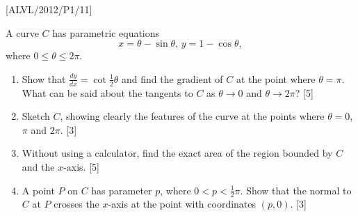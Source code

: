 \item {[}ALVL/2012/P1/11{]}

A curve $C$ has parametric equations 
\[
x=\theta-\sin\theta,\,y=1-\cos\theta,
\]
where $0\le\theta\le2\pi$.
\begin{enumerate}
\item Show that $\frac{dy}{dx}=\cot\frac{1}{2}\theta$ and find the gradient
of $C$ at the point where $\theta=\pi$. What can be said about the
tangents to $C$ as $\theta\rightarrow0$ and $\theta\rightarrow2\pi$?
\hfill{}{[}5{]}
\item Sketch $C$, showing clearly the features of the curve at the points
where $\theta=0$, $\pi$ and $2\pi$. \hfill{}{[}3{]}
\item Without using a calculator, find the exact area of the region bounded
by $C$ and the $x$-axis. \hfill{}{[}5{]}
\item A point $P$ on $C$ has parameter $p$, where $0<p<\frac{1}{2}\pi$.
Show that the normal to $C$ at $P$ crosses the $x$-axis at the
point with coordinates $\left(p,0\right)$. \hfill{} {[}3{]}
\end{enumerate}
